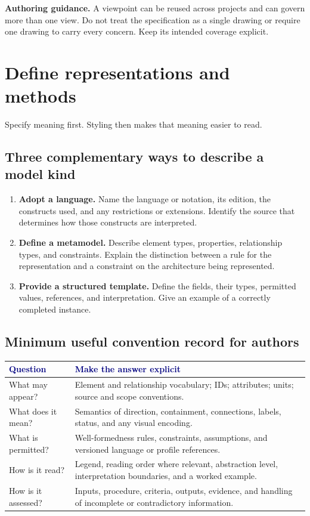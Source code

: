 \documentclass[11pt,letterpaper]{article}
\newcommand{\TemplatePageBreak}{\clearpage}
\newcommand{\TableHead}[1]{\textcolor{Navy}{\sffamily\bfseries#1}}
\newcommand{\Lead}[1]{\textcolor{Muted}{#1}\par\vspace{3pt}}
\newcommand{\Guide}[1]{\par{\small\textcolor{Muted}{\textbf{Authoring guidance.} #1}}\par}
\begin{document}
\Guide{A viewpoint can be reused across projects and can govern more than one
view. Do not treat the specification as a single drawing or require one drawing
to carry every concern. Keep its intended coverage explicit.}

\TemplatePageBreak
\section{Define representations and methods}
\Lead{Specify meaning first. Styling then makes that meaning easier to read.}

\subsection{Three complementary ways to describe a model kind}
\begin{enumerate}
\item \textbf{Adopt a language.} Name the language or notation, its edition,
the constructs used, and any restrictions or extensions. Identify the source
that determines how those constructs are interpreted.
\item \textbf{Define a metamodel.} Describe element types, properties,
relationship types, and constraints. Explain the distinction between a rule
for the representation and a constraint on the architecture being represented.
\item \textbf{Provide a structured template.} Define the fields, their types,
permitted values, references, and interpretation. Give an example of a correctly
completed instance.
\end{enumerate}

\subsection{Minimum useful convention record for authors}
{\small
\begin{tabularx}{\linewidth}{@{}L{1.25in}Y@{}}
\toprule
\TableHead{Question} & \TableHead{Make the answer explicit}\\
\midrule
What may appear? & Element and relationship vocabulary; IDs; attributes; units;
source and scope conventions.\\
What does it mean? & Semantics of direction, containment, connections, labels,
status, and any visual encoding.\\
What is permitted? & Well-formedness rules, constraints, assumptions, and
versioned language or profile references.\\
How is it read? & Legend, reading order where relevant, abstraction level,
interpretation boundaries, and a worked example.\\
How is it assessed? & Inputs, procedure, criteria, outputs, evidence, and
handling of incomplete or contradictory information.\\
\bottomrule
\end{tabularx}}
\end{document}
